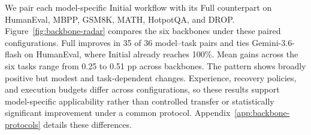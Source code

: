 We pair each model-specific Initial workflow with its Full counterpart on HumanEval, MBPP, GSM8K, MATH, HotpotQA, and DROP. Figure~\ref{fig:backbone-radar} compares the six backbones under these paired configurations. Full improves in 35 of 36 model--task pairs and ties Gemini-3.6-flash on HumanEval, where Initial already reaches 100\%. Mean gains across the six tasks range from 0.25 to 0.51 pp across backbones. The pattern shows broadly positive but modest and task-dependent changes. Experience, recovery policies, and execution budgets differ across configurations, so these results support model-specific applicability rather than controlled transfer or statistically significant improvement under a common protocol. Appendix~\ref{app:backbone-protocols} details these differences.

\FloatBarrier
